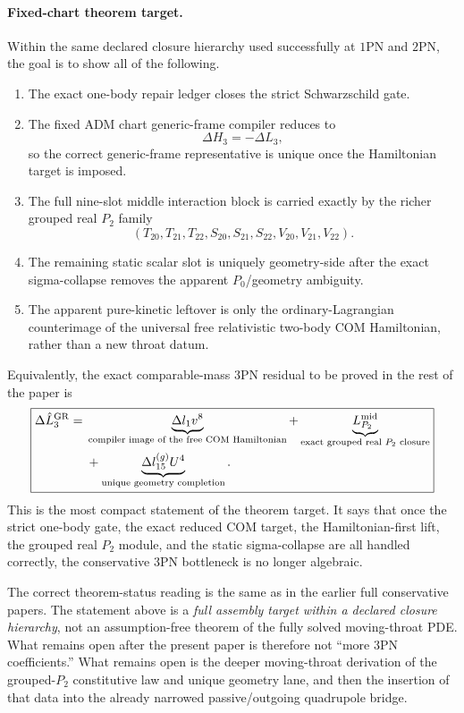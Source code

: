 \documentclass[11pt]{article}
\begin{document}
\paragraph{Fixed-chart theorem target.}
Within the same declared closure hierarchy used successfully at $1$PN and $2$PN,
the goal is to show all of the following.
\begin{enumerate}
  \item The exact one-body repair ledger closes the strict Schwarzschild gate.

  \item The fixed ADM chart generic-frame compiler reduces to
  \[
  \Delta H_3=-\Delta L_3,
  \]
  so the correct generic-frame representative is unique once the Hamiltonian
  target is imposed.

  \item The full nine-slot middle interaction block is carried exactly by the
  richer grouped real $P_2$ family
  \[
  (T_{20},T_{21},T_{22},S_{20},S_{21},S_{22},V_{20},V_{21},V_{22}).
  \]

  \item The remaining static scalar slot is uniquely geometry-side after the
  exact sigma-collapse removes the apparent $P_0$/geometry ambiguity.

  \item The apparent pure-kinetic leftover is only the ordinary-Lagrangian
  counterimage of the universal free relativistic two-body COM Hamiltonian,
  rather than a new throat datum.
\end{enumerate}
Equivalently, the exact comparable-mass $3$PN residual to be proved in the rest
of the paper is
\[
\boxed{
\begin{aligned}
\Delta \hat L_3^{\rm GR}
=\;&\underbrace{\Delta l_1 v^8}_{\text{compiler image of the free COM Hamiltonian}}
+\underbrace{L_{P_2}^{\rm mid}}_{\text{exact grouped real }P_2\text{ closure}}
\\
&+\underbrace{\Delta l_{15}^{(g)}U^4}_{\text{unique geometry completion}}.
\end{aligned}
}
\]
This is the most compact statement of the theorem target.  It says that once the
strict one-body gate, the exact reduced COM target, the Hamiltonian-first lift,
the grouped real $P_2$ module, and the static sigma-collapse are all handled
correctly, the conservative $3$PN bottleneck is no longer algebraic.

The correct theorem-status reading is the same as in the earlier full
conservative papers.  The statement above is a \emph{full assembly target within
a declared closure hierarchy}, not an assumption-free theorem of the fully solved
moving-throat PDE.  What remains open after the present paper is therefore not
``more $3$PN coefficients.''  What remains open is the deeper moving-throat
derivation of the grouped-$P_2$ constitutive law and unique geometry lane, and
then the insertion of that data into the already narrowed passive/outgoing
quadrupole bridge.
\end{document}
